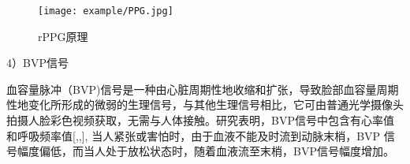 \begin{figure}[!htp]

\centering
\texttt{[image: example/PPG.jpg]}
\caption{rPPG原理}
\label{fig:1-2}

\end{figure}

4）BVP信号

血容量脉冲（BVP)信号是一种由心脏周期性地收缩和扩张，导致脸部血容量周期性地变化所形成的微弱的生理信号，与其他生理信号相比，它可由普通光学摄像头拍摄人脸彩色视频获取，无需与人体接触。研究表明，BVP信号中包含有心率值和呼吸频率值[\cite{osman2015supervised},\cite{poh2010advancements},\cite{monkaresi2013machine}], 当人紧张或害怕时，由于血液不能及时流到动脉末梢，BVP 信号幅度偏低，而当人处于放松状态时，随着血液流至末梢，BVP信号幅度增加。



\begin{table}[]
\centering
\caption{ECG,PPG,rPPG三者优缺点比较}
\end{table}

